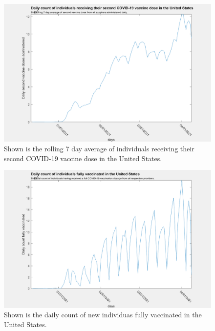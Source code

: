 \documentclass[twoside]{article}
\begin{document}
\begin{multicols}{2}
\begin{figure}[H]
	\includegraphics[width=\linewidth]{images/usa_daily_second_doses_processed.png}
	\caption{Shown is the rolling 7 day average of individuals receiving their second COVID-19 vaccine dose in the United States.}
	\label{fig:images/usa_daily_second_doses_processedLabel}
\end{figure}

\begin{figure}[H]
	\includegraphics[width=\linewidth]{images/usa_daily_fully_vaccinated_unprocessed.png}
	\caption{Shown is the daily count of new individuas fully vaccinated in the United States. }
	\label{fig:images/usa_daily_fully_vaccinated_unprocessedLabel}
\end{figure}


\end{multicols}
\end{document}
